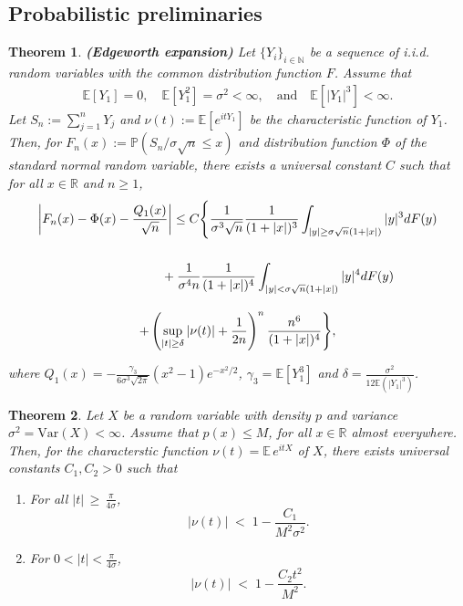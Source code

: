 \documentclass[9pt,a4paper,reqno]{amsart}
\newcommand{\N}{{\mathbb{N}}}
\theoremstyle{mine}
\newtheorem{thm}{Theorem}[section]
\theoremstyle{definition}
\theoremstyle{remark}
\newcommand{\mb}{\mathbb}
\begin{document}
\subsection{Probabilistic preliminaries}
\begin{thm}\label{edgeworth expansion Theorem}\textbf{(Edgeworth expansion)}\cite[Theorem $1$-Chapter $6$]{Petrov-sumsofindipendentrandomvariables}
    Let $\{Y_i\}_{i \in \N}$ be a sequence of i.i.d. random variables with the common distribution function $F$. Assume that 
    \begin{align*}
        \mb{E}[Y_1]=0, \quad \mb{E}[Y_1^2]= \sigma^2 <\infty,  \quad \textrm{and} \quad  \mb{E}[|Y_1|^3] < \infty.
    \end{align*}
    Let $S_n := \sum_{j=1}^nY_j$ and $\nu(t):=\mb{E}[e^{itY_1}]$ be the characteristic function  of $Y_1$. Then, for $F_n(x):=\mb{P}\left(S_n/\sigma\sqrt{n} \leq x\right)$ and distribution function $\Phi$ of the standard normal random variable, there exists a universal constant $C$ such that for all $x\in \mb{R}$ and $n\geq 1$, 
     \begin{multline}\label{edgeworth expansion}
        \left| F_n(x)- \Phi(x)- \frac{Q_1(x)}{\sqrt{n}}\right| \leq C \Bigg\{ \frac{1}{\sigma^3 \sqrt{n}} \frac{1}{(1+|x|)^3} \int_{|y|\geq \sigma\sqrt{n}(1+|x|)} |y|^3 dF(y)\\[1.5em]
          \hphantom{xxxxxxxxxxx} +\frac{1}{\sigma^4{n}}  \frac{1}{(1+|x|)^4} \int_{|y|< \sigma\sqrt{n}(1+|x|)}  |y|^4 dF(y) \\[1em]
         + \left( \sup_{|t|\geq \delta} |\nu(t)|+\frac{1}{2n}\right)^n  \frac{n^6}{(1+|x|)^4}\Bigg\},
    \end{multline}  
    
    where $Q_1(x) = - \frac{\gamma_3}{6\sigma^3\sqrt{2\pi}} (x^2-1) e^{-x^2/2}$, $\gamma_3=\mb{E}[Y_1^3]$ and $\delta= \frac{\sigma^2}{12 \mb{E}(|Y_1|^3)}$.
\end{thm}


\begin{thm}\label{bobkov et al Theorem}\cite[Theorem 1]{Bobkov-etal}
    Let $X$ be a random variable with density $p$ and variance 
$\sigma^{2} = \mathrm{Var}(X)< \infty$. Assume that $p(x) \leq M$, for all $x\in \mb{R}$ almost everywhere. Then, for the characterstic function $\nu(t) = \mathbb{E}\, e^{itX}$ of $X$, there exists universal constants $C_1, C_2 >0$ such that 

\begin{enumerate}
    \item For all $ |t| \,\geq\, \tfrac{\pi}{4\sigma}$,
    \begin{equation}\label{bobkov eq:bound1}
        |\nu(t)| \;<\; 1 - \frac{C_{1}}{M^{2}\sigma^{2}}.
    \end{equation}

    \item For $0 <  |t| < \tfrac{\pi}{4\sigma}$,
    \begin{equation}\label{bobkov eq:bound2}
        |\nu(t)|\;<\; 1 - \frac{C_{2}t^{2} }{M^{2}} .
    \end{equation}
\end{enumerate}
\end{thm}
\end{document}
